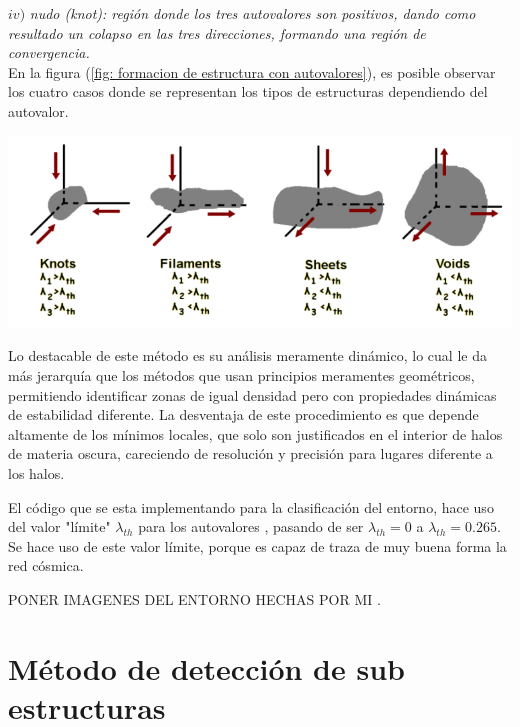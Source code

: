 $iv)$ {\it{nudo (knot)}: región donde los tres autovalores son positivos, dando como resultado un colapso en las tres direcciones, formando una región de convergencia.}\\

En la figura (\ref{fig: formacion de estructura con autovalores}), es posible observar los cuatro casos donde se representan los tipos de estructuras dependiendo del autovalor.
%
\begin{center}
\includegraphics[scale=.39]{./figures/5_Algoritmo_Modelacion/formacion_estructuras.png}
\label{fig: formacion de estructura con autovalores}
\end{center}
%
Lo destacable de este método es su análisis meramente dinámico, lo cual le da más jerarquía que los métodos que usan principios meramentes geométricos, permitiendo identificar zonas de igual densidad pero con propiedades dinámicas de estabilidad diferente. La desventaja de este procedimiento es que depende altamente de los mínimos locales, que solo son justificados en el interior de halos de materia oscura, careciendo de resolución y precisión para lugares diferente a los halos.

El código que se esta implementando para la clasificación del entorno, hace uso del valor "límite" $\lambda_{th}$ para los autovalores \cite{bustamante2015}, pasando de ser $\lambda_{th}=0$ a $\lambda_{th}=0.265$. Se hace uso de este valor límite, porque es capaz de traza de muy buena forma la red cósmica. 

PONER IMAGENES DEL ENTORNO HECHAS POR MI .


\section{Método de detección de sub estructuras}
\label{sec: detección sub-estructuras}

